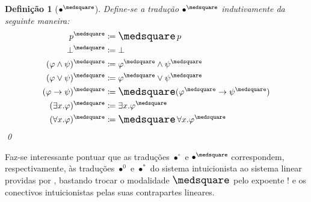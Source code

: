 \documentclass{report}
\newtheorem{definition}{Definição}
\begin{document}
    \begin{definition}[$\bullet^\medsquare$] Define-se a tradução $\bullet^\medsquare$ indutivamente da seguinte maneira:
        \begin{align*}
            p^\medsquare                     & \coloneqq \nec p                                        \\
            \bot^\medsquare                  & \coloneqq \bot                                          \\
            (\varphi \wedge \psi)^\medsquare & \coloneqq \varphi^\medsquare \wedge \psi^\medsquare     \\
            (\varphi \vee \psi)^\medsquare   & \coloneqq \varphi^\medsquare \vee \psi^\medsquare       \\
            (\varphi \to \psi)^\medsquare    & \coloneqq \nec (\varphi^\medsquare \to \psi^\medsquare) \\
            (\exists x. \varphi)^\medsquare  & \coloneqq \exists x. \varphi^\medsquare                 \\
            (\forall x. \varphi)^\medsquare  & \coloneqq \nec \forall x. \varphi^\medsquare
        \end{align*}
        \qed
    \end{definition}

    Faz-se interessante pontuar que as traduções $\bullet^\circ$ e $\bullet^\medsquare$ correspondem, respectivamente, às traduções $\bullet^0$ e $\bullet^*$ do sistema intuicionista ao sistema linear providas por \cite{Girard}, bastando trocar o modalidade $\nec$ pelo expoente $!$ e os conectivos intuicionistas pelas suas contrapartes lineares.

    
    
\end{document}
